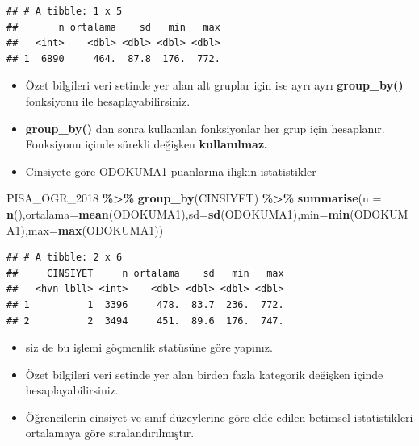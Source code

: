 \documentclass[
  oneside]{book}
\newenvironment{Shaded}{\begin{snugshade}}{\end{snugshade}}
\newcommand{\AttributeTok}[1]{\textcolor[rgb]{0.13,0.29,0.53}{#1}}
\newcommand{\FunctionTok}[1]{\textcolor[rgb]{0.13,0.29,0.53}{\textbf{#1}}}
\newcommand{\NormalTok}[1]{#1}
\newcommand{\SpecialCharTok}[1]{\textcolor[rgb]{0.81,0.36,0.00}{\textbf{#1}}}
\begin{document}
\begin{verbatim}
## # A tibble: 1 x 5
##       n ortalama    sd   min   max
##   <int>    <dbl> <dbl> <dbl> <dbl>
## 1  6890     464.  87.8  176.  772.
\end{verbatim}

\begin{itemize}
\item
  Özet bilgileri veri setinde yer alan alt gruplar için ise ayrı ayrı \textbf{group\_by()} fonksiyonu ile hesaplayabilirsiniz.
\item
  \textbf{group\_by()} dan sonra kullanılan fonksiyonlar her grup için hesaplanır. Fonksiyonu içinde sürekli değişken \textbf{kullanılmaz.}
\item
  Cinsiyete göre ODOKUMA1 puanlarına ilişkin istatistikler
\end{itemize}

\begin{Shaded}
\begin{Highlighting}[]
\NormalTok{PISA\_OGR\_2018 }\SpecialCharTok{\%\textgreater{}\%}
  \FunctionTok{group\_by}\NormalTok{(CINSIYET) }\SpecialCharTok{\%\textgreater{}\%}
  \FunctionTok{summarise}\NormalTok{(}\AttributeTok{n =} \FunctionTok{n}\NormalTok{(),}\AttributeTok{ortalama=}\FunctionTok{mean}\NormalTok{(ODOKUMA1),}\AttributeTok{sd=}\FunctionTok{sd}\NormalTok{(ODOKUMA1),}\AttributeTok{min=}\FunctionTok{min}\NormalTok{(ODOKUMA1),}\AttributeTok{max=}\FunctionTok{max}\NormalTok{(ODOKUMA1))}
\end{Highlighting}
\end{Shaded}

\begin{verbatim}
## # A tibble: 2 x 6
##     CINSIYET     n ortalama    sd   min   max
##   <hvn_lbll> <int>    <dbl> <dbl> <dbl> <dbl>
## 1          1  3396     478.  83.7  236.  772.
## 2          2  3494     451.  89.6  176.  747.
\end{verbatim}

\begin{itemize}
\item
  siz de bu işlemi göçmenlik statüsüne göre yapınız.
\item
  Özet bilgileri veri setinde yer alan birden fazla kategorik değişken içinde hesaplayabilirsiniz.
\item
  Öğrencilerin cinsiyet ve sınıf düzeylerine göre elde edilen betimsel istatistikleri ortalamaya göre sıralandırılmıştır.
\end{itemize}
\end{document}
